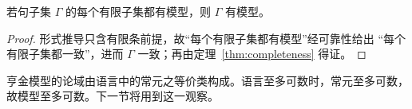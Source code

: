 \begin{corollary}[紧致性定理]
若句子集 $\Gamma$ 的每个有限子集都有模型，则 $\Gamma$ 有模型。
\end{corollary}
\begin{proof}
形式推导只含有限条前提，故“每个有限子集都有模型”经可靠性给出
“每个有限子集都一致”，进而 $\Gamma$ 一致；再由定理~\ref{thm:completeness} 得证。
\end{proof}

\begin{remark}\label{rem:countable}
亨金模型的论域由语言中的常元之等价类构成。语言至多可数时，常元至多可数，
故模型至多可数。下一节将用到这一观察。
\end{remark}
